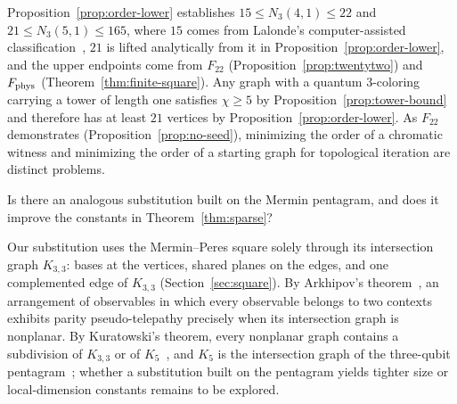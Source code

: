 Proposition~\ref{prop:order-lower} establishes $15\le N_3(4,1)\le22$ and $21\le N_3(5,1)\le165$, where $15$ comes from Lalonde's computer-assisted classification~\cite{La}, $21$ is lifted analytically from it in Proposition~\ref{prop:order-lower}, and the upper endpoints come from $F_{22}$ (Proposition~\ref{prop:twentytwo}) and $F_{\rm phys}$ (Theorem~\ref{thm:finite-square}). Any graph with a quantum $3$-coloring carrying a tower of length one satisfies $\chi\ge5$ by Proposition~\ref{prop:tower-bound} and therefore has at least $21$ vertices by Proposition~\ref{prop:order-lower}. As $F_{22}$ demonstrates (Proposition~\ref{prop:no-seed}), minimizing the order of a chromatic witness and minimizing the order of a starting graph for topological iteration are distinct problems.

\begin{problem}\label{prob:pentagram}
Is there an analogous substitution built on the Mermin pentagram, and does it improve the constants in Theorem~\ref{thm:sparse}?
\end{problem}

Our substitution uses the Mermin--Peres square solely through its intersection graph $K_{3,3}$: bases at the vertices, shared planes on the edges, and one complemented edge of $K_{3,3}$ (Section~\ref{sec:square}). By Arkhipov's theorem~\cite[Theorem~21]{Arkhipov}, an arrangement of observables in which every observable belongs to two contexts exhibits parity pseudo-telepathy precisely when its intersection graph is nonplanar. By Kuratowski's theorem, every nonplanar graph contains a subdivision of $K_{3,3}$ or of $K_5$~\cite[Theorem~27]{Arkhipov}, and $K_5$ is the intersection graph of the three-qubit pentagram~\cite[Example~20]{Arkhipov}; whether a substitution built on the pentagram yields tighter size or local-dimension constants remains to be explored.
